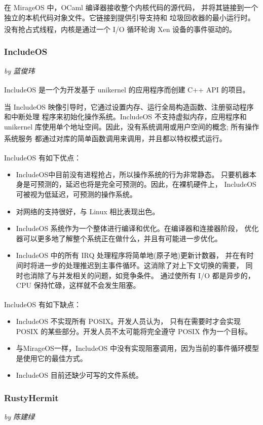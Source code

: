 \documentclass[UTF8,fontset=none,linespread=1.15]{ctexart}
\let\nosupcite\cite
\renewcommand*{\cite}[1]{\textsuperscript{\nosupcite{#1}}}
\newcommand{\sectionauthor}[1]{%
\vspace*{-5ex}
\noindent\textrm{\hfill\textit{by #1}}
\vspace*{2ex}\par}
\begin{document}
在 MirageOS 中，OCaml 编译器接收整个内核代码的源代码，
并将其链接到一个独立的本机代码对象文件。它链接到提供引导支持和
垃圾回收器的最小运行时。没有抢占式线程，内核是通过一个 I/O 循环轮询
Xen 设备的事件驱动的。\cite{bib:11-unikerel2}

\subsubsection{IncludeOS}\sectionauthor{蓝俊玮}

IncludeOS 是一个为开发基于 unikernel 的应用程序而创建 C++ API 的项目。\cite{bib:9-includeos}

当 IncludeOS 映像引导时，它通过设置内存、运行全局构造函数、注册驱动程序和中断处理
程序来初始化操作系统。IncludeOS 不支持虚拟内存，应用程序和
 unikernel 库使用单个地址空间。因此，没有系统调用或用户空间的概念; 所有操作系统服务
 都通过对库的简单函数调用来调用，并且都以特权模式运行。\cite{bib:10-includeos2}

\noindent IncludeOS 有如下优点：\cite{bib:9-includeos}
\begin{itemize}
\item IncludeOS中目前没有进程抢占，所以操作系统的行为非常静态。
只要机器本身是可预测的，延迟也将是完全可预测的。因此，在裸机硬件上，
IncludeOS可被视为低延迟，可预测的操作系统。
\item 对网络的支持很好，与 Linux 相比表现出色。
\item IncludeOS 系统作为一个整体进行编译和优化。在编译器和连接器阶段，
优化器可以更多地了解整个系统正在做什么，并且有可能进一步优化。
\item IncludeOS 中的所有 IRQ 处理程序将简单地(原子地)更新计数器，
并在有时间时将进一步的处理推迟到主事件循环。这消除了对上下文切换的需要，
同时也消除了与并发相关的问题，如竞争条件。
通过使所有 I/O 都是异步的，CPU 保持忙碌，这样就不会发生阻塞。
\end{itemize}

\noindent IncludeOS 有如下缺点：\cite{bib:9-includeos}
\begin{itemize}
\item IncludeOS 不实现所有 POSIX。开发人员认为，
只有在需要时才会实现 POSIX 的某些部分。开发人员不太可能将完全遵守 POSIX 作为一个目标。
\item 与MirageOS一样，IncludeOS 中没有实现阻塞调用，因为当前的事件循环模型是使用它的最佳方式。
\item IncludeOS 目前还缺少可写的文件系统。
\end{itemize}

\subsubsection{RustyHermit}\sectionauthor{陈建绿}
\end{document}
